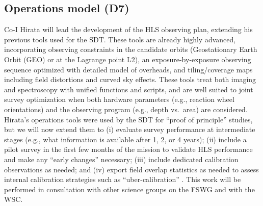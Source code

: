 {%

\subsection{Operations model (D7)}

Co-I Hirata will lead the development of the HLS observing plan, 
extending his previous tools used for the SDT. These tools are already 
highly advanced, incorporating observing constraints in the candidate 
orbits (Geostationary Earth Orbit (GEO) or at the Lagrange point L2),
an exposure-by-exposure observing sequence optimized  
with detailed model of overheads, and tiling/coverage maps including 
field distortions and curved sky effects. These tools treat both imaging 
and spectroscopy with unified functions and scripts, and are well suited to joint survey optimization when 
both hardware parameters (e.g., reaction wheel orientations) and the 
observing program (e.g., depth vs.\ area) are considered.
Hirata's operations tools were 
used by the SDT for ``proof of principle'' studies, but we will now 
extend them to (i) evaluate survey performance at intermediate stages 
(e.g., what information is available after 1, 2, or 4 years); (ii) 
include a pilot survey in the first few months of the mission to 
validate HLS performance and make any ``early changes'' necessary;
(iii) include dedicated calibration observations as needed; and (iv)
export field overlap statistics as needed to assess internal calibration
strategies such as ``uber-calibration'' \cite{Padmanabhan2008}. This work will
be performed in consultation with other science groups on the FSWG and with
the WSC.

}
